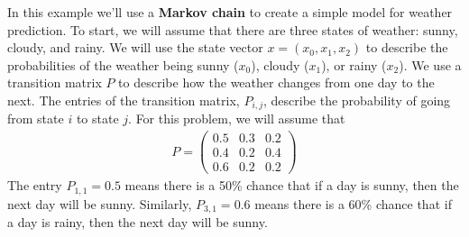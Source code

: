 \documentclass[11pt]{report}
\begin{document}
\begin{Exercise}[title=Weather prediction (Advanced)]

  In this example we'll use a \textbf{Markov chain} to create a simple
  model for weather prediction. To start, we will assume that there are
  three states of weather: sunny, cloudy, and rainy. We
  will use the state vector $x = (x_0, x_1, x_2)$ to describe the probabilities
  of the weather being sunny ($x_0$), cloudy ($x_1$), or rainy ($x_2$).
  We use a transition matrix $P$ to describe how the weather changes from one
  day to the next. The entries of the transition matrix, $P_{i,j}$, describe
  the probability of going from state $i$ to state $j$. For this problem,
  we will assume that
  \begin{align}
    P = \begin{pmatrix}
      0.5 & 0.3 & 0.2 \\
      0.4 & 0.2 & 0.4 \\
      0.6 & 0.2 & 0.2
    \end{pmatrix}
  \end{align}
  The entry $P_{1,1} = 0.5$ means there is a 50\% chance that if a day is sunny,
  then the next day will be sunny. Similarly, $P_{3,1} = 0.6$ means there is a
  60\% chance that if a day is rainy, then the next day will be sunny.
  



\end{Exercise}
\end{document}
